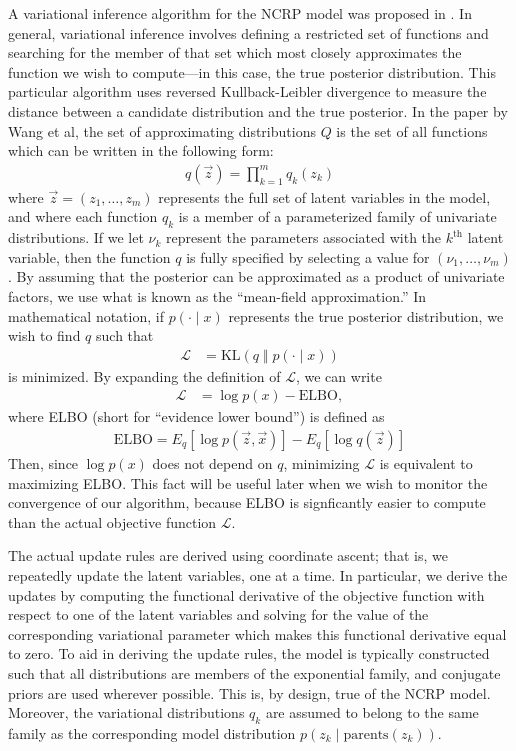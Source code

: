 \documentclass{article}
\newcommand{\nth}{^{\text{th}}}
\begin{document}
A variational inference algorithm for the NCRP model was proposed in \cite{wang2009vi_ncrp}.
In general, variational inference involves defining a restricted set of functions and searching for the member of that set which most closely approximates the function we wish to compute---in this case, the true posterior distribution.
This particular algorithm uses reversed Kullback-Leibler divergence to measure the distance between a candidate distribution and the true posterior.
In the paper by Wang et al, the set of approximating distributions $Q$ is the set of all functions which can be written in the following form:
\begin{align}
q(\vec z) = \prod_{k=1}^m q_k(z_k)
\end{align}
where $\vec z = (z_1, \ldots, z_m)$ represents the full set of latent variables in the model, and where each function $q_k$ is a member of a parameterized family of univariate distributions.
If we let $\nu_k$ represent the parameters associated with the $k\nth$ latent variable, then the function $q$ is fully specified by selecting a value for $(\nu_1, \ldots, \nu_m)$.
By assuming that the posterior can be approximated as a product of univariate factors, we use what is known as the ``mean-field approximation.''
In mathematical notation, if $p(\cdot \mid x)$ represents the true posterior distribution, we wish to find $q$ such that
\begin{align}
\mathcal L &= \text{KL}( q \;\Vert\; p(\cdot \mid x) )
\end{align}
is minimized.
By expanding the definition of $\mathcal L$, we can write
\begin{align}
\mathcal L &= \log p(x) - \text{ELBO},
\end{align}
where ELBO (short for ``evidence lower bound'') is defined as
\begin{align}
\text{ELBO} = E_q[\log p(\vec z, \vec x)] - E_q[\log q(\vec z)]
\end{align}
Then, since $\log p(x)$ does not depend on $q$, minimizing $\mathcal L$ is equivalent to maximizing ELBO.
This fact will be useful later when we wish to monitor the convergence of our algorithm, because ELBO is signficantly easier to compute than the actual objective function $\mathcal L$.

The actual update rules are derived using coordinate ascent; that is, we repeatedly update the latent variables, one at a time.
In particular, we derive the updates by computing the functional derivative of the objective function with respect to one of the latent variables and solving for the value of the corresponding variational parameter which makes this functional derivative equal to zero.
To aid in deriving the update rules, the model is typically constructed such that all distributions are members of the exponential family, and conjugate priors are used wherever possible.
This is, by design, true of the NCRP model.
Moreover, the variational distributions $q_k$ are assumed to belong to the same family as the corresponding model distribution $p(z_k \mid \text{parents}(z_k))$.
\end{document}
